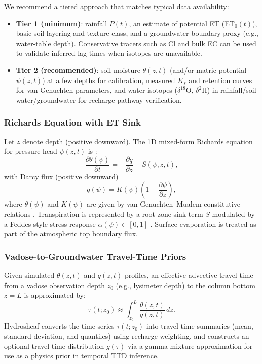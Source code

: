 \documentclass[12pt,a4paper]{article}
\theoremstyle{plain}
\theoremstyle{definition}
\theoremstyle{remark}
\begin{document}
We recommend a tiered approach that matches typical data availability:
\begin{itemize}
	\item \textbf{Tier 1 (minimum)}: rainfall $P(t)$, an estimate of potential ET (ET$_0(t)$), basic soil layering and texture class, and a groundwater boundary proxy (e.g., water-table depth). Conservative tracers such as Cl and bulk EC can be used to validate inferred lag times when isotopes are unavailable.
	\item \textbf{Tier 2 (recommended)}: soil moisture $\theta(z,t)$ (and/or matric potential $\psi(z,t)$) at a few depths for calibration, measured $K_s$ and retention curves for van Genuchten parameters, and water isotopes ($\delta^{18}$O, $\delta^2$H) in rainfall/soil water/groundwater for recharge-pathway verification.
\end{itemize}

\subsubsection{Richards Equation with ET Sink}

Let $z$ denote depth (positive downward). The 1D mixed-form Richards equation for pressure head $\psi(z,t)$ is \cite{richards1931}:
\begin{equation}
	\frac{\partial \theta(\psi)}{\partial t} = -\frac{\partial q}{\partial z} - S(\psi,z,t),
\end{equation}
with Darcy flux (positive downward)
\begin{equation}
	q(\psi) = K(\psi)\left(1 - \frac{\partial \psi}{\partial z}\right),
\end{equation}
where $\theta(\psi)$ and $K(\psi)$ are given by van Genuchten--Mualem constitutive relations \cite{vangenuchten1980, mualem1976}. Transpiration is represented by a root-zone sink term $S$ modulated by a Feddes-style stress response $\alpha(\psi)\in[0,1]$ \cite{feddes1978}. Surface evaporation is treated as part of the atmospheric top boundary flux.

\subsubsection{Vadose-to-Groundwater Travel-Time Priors}

Given simulated $\theta(z,t)$ and $q(z,t)$ profiles, an effective advective travel time from a vadose observation depth $z_0$ (e.g., lysimeter depth) to the column bottom $z=L$ is approximated by:
\begin{equation}
	\tau(t; z_0) \approx \int_{z_0}^{L} \frac{\theta(z,t)}{q(z,t)}\, dz.
\end{equation}
Hydrosheaf converts the time series $\tau(t;z_0)$ into travel-time summaries (mean, standard deviation, and quantiles) using recharge-weighting, and constructs an optional travel-time distribution $g(\tau)$ via a gamma-mixture approximation for use as a physics prior in temporal TTD inference.
\end{document}
